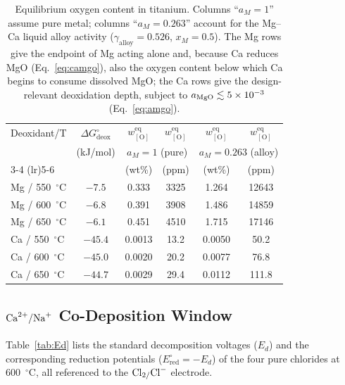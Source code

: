 \documentclass[11pt]{article}
\begin{document}
\begin{table}[!ht]
\centering
\footnotesize
\caption{Equilibrium oxygen content in titanium. Columns ``$a_M=1$'' assume pure metal; columns ``$a_M=0.263$'' account for the Mg--Ca liquid alloy activity ($\gamma_{\mathrm{alloy}}=0.526$, $x_M=0.5$). The Mg rows give the endpoint of Mg acting alone and, because Ca reduces MgO (Eq.~\ref{eq:camgo}), also the oxygen content below which Ca begins to consume dissolved MgO; the Ca rows give the design-relevant deoxidation depth, subject to $a_{\ce{MgO}} \lesssim 5\times10^{-3}$ (Eq.~\ref{eq:amgo}).}
\label{tab:deox}
\begin{tabular}{lccccc}
\toprule
Deoxidant/T & $\Delta G^{\circ}_{\mathrm{deox}}$ & $w_{[\mathrm{O}]}^{\mathrm{eq}}$ & $w_{[\mathrm{O}]}^{\mathrm{eq}}$ & $w_{[\mathrm{O}]}^{\mathrm{eq}}$ & $w_{[\mathrm{O}]}^{\mathrm{eq}}$ \\
 & (kJ/mol) & \multicolumn{2}{c}{$a_M=1$ (pure)} & \multicolumn{2}{c}{$a_M=0.263$ (alloy)} \\
\cmidrule(lr){3-4} \cmidrule(lr){5-6}
 & & (wt\%) & (ppm) & (wt\%) & (ppm) \\
\midrule
Mg / 550~$^{\circ}$C & $-7.5$ & 0.333 & 3325 & 1.264 & 12643 \\
Mg / 600~$^{\circ}$C & $-6.8$ & 0.391 & 3908 & 1.486 & 14859 \\
Mg / 650~$^{\circ}$C & $-6.1$ & 0.451 & 4510 & 1.715 & 17146 \\
Ca / 550~$^{\circ}$C & $-45.4$ & 0.0013 & 13.2 & 0.0050 & 50.2 \\
Ca / 600~$^{\circ}$C & $-45.0$ & 0.0020 & 20.2 & 0.0077 & 76.8 \\
Ca / 650~$^{\circ}$C & $-44.7$ & 0.0029 & 29.4 & 0.0112 & 111.8 \\
\bottomrule
\end{tabular}
\end{table}

\subsection*{\texorpdfstring{$\ce{Ca^{2+}/Na+}$}{Ca2+/Na+} Co-Deposition Window}

Table~\ref{tab:Ed} lists the standard decomposition voltages ($E_d$) and the corresponding reduction potentials ($E^{\circ}_{\mathrm{red}} = -E_d$) of the four pure chlorides at 600~$^{\circ}$C, all referenced to the $\ce{Cl2/Cl-}$ electrode.
\end{document}

